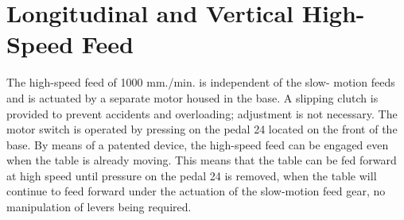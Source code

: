     {\let\clearpage\relax


\chapter{Longitudinal and Vertical High-Speed Feed}}

The high-speed feed of 1000 mm./min. is independent of the slow-
motion feeds and is actuated by a separate motor housed in the
base. A slipping clutch is provided to prevent accidents and
overloading; adjustment is not necessary. The motor switch is
operated by pressing on the pedal 24 located on the front of
the base. By means of a patented device, the high-speed feed can
be engaged even when the table is already moving. This means
that the table can be fed forward at high speed until pressure
on the pedal 24 is removed, when the table will continue to
feed forward under the actuation of the slow-motion feed gear,
no manipulation of levers being required.
